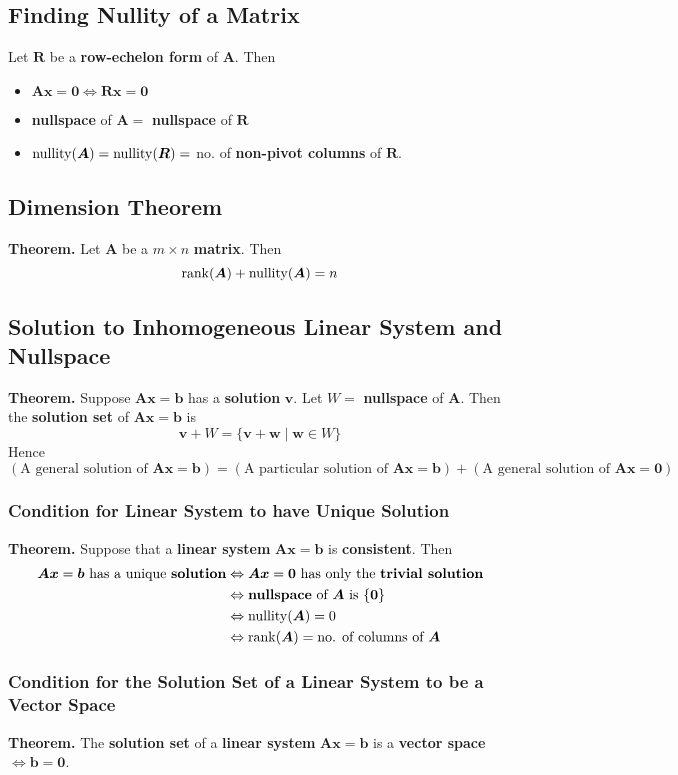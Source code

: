 \documentclass[../ma2001_notes.tex]{subfiles}
\begin{document}
\subsection{Finding Nullity of a Matrix}
Let \(\bm{R}\) be a \textbf{row-echelon form} of \(\bm{A}\). Then
\begin{itemize}
 	\item\(\bm{Ax}=\bm{0}\Leftrightarrow\bm{Rx}=\bm{0}\)
 	\item\textbf{nullspace} of \(\bm{A}=\) \textbf{nullspace} of \(\bm{R}\)
 	\item\(\operatorname{nullity}(\bm{A})=\operatorname{nullity}(\bm{R})=\) no. of \textbf{non-pivot columns} of \(\bm{R}\).
\end{itemize}

\subsection{Dimension Theorem}
\textbf{Theorem.} Let \(\bm{A}\) be a \(m\times n\) \textbf{matrix}. Then
\[\operatorname{rank}(\bm{A})+\operatorname{nullity}(\bm{A})=n\]

\subsection{Solution to Inhomogeneous Linear System and Nullspace}
\textbf{Theorem.} Suppose \(\bm{Ax}=\bm{b}\) has a \textbf{solution} \(\bm{v}\). Let \(W=\) \textbf{nullspace} of \(\bm{A}\). Then the \textbf{solution set} of \(\bm{Ax}=\bm{b}\) is
\[\bm{v}+W=\{\bm{v}+\bm{w}\mid\bm{w}\in W\}\]
Hence
\[(\text{A general solution of }\bm{Ax}=\bm{b})=(\text{A particular solution of }\bm{Ax}=\bm{b})+(\text{A general solution of }\bm{Ax}=\bm{0})\]

\subsubsection{Condition for Linear System to have Unique Solution}
\textbf{Theorem.} Suppose that a \textbf{linear system} \(\bm{Ax}=\bm{b}\) is \textbf{consistent}. Then
\begin{align*}
	\bm{Ax}=\bm{b}\text{ has a unique }\textbf{solution}
	&\Leftrightarrow\bm{Ax}=\bm{0}\text{ has only the }\textbf{trivial solution} \\
	&\Leftrightarrow\textbf{nullspace}\text{ of }\bm{A}\text{ is }\{\bm{0}\} \\
	&\Leftrightarrow\operatorname{nullity}(\bm{A})=0 \\
	&\Leftrightarrow\operatorname{rank}(\bm{A})=\text{no. of columns of }\bm{A}
\end{align*}

\subsubsection{Condition for the Solution Set of a Linear System to be a Vector Space}
\textbf{Theorem.} The \textbf{solution set} of a \textbf{linear system} \(\bm{Ax}=\bm{b}\) is a \textbf{vector space} \(\Leftrightarrow\bm{b}=\bm{0}\).
\end{document}
